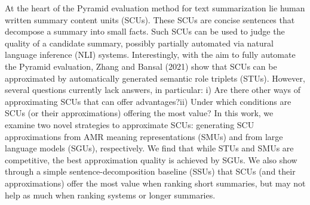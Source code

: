 At the heart of the Pyramid evaluation method for text summarization lie human written summary content units (SCUs). These SCUs are concise sentences that decompose a summary into small facts. Such SCUs can be used to judge the quality of a candidate summary, possibly partially automated via natural language inference (NLI) systems. Interestingly, with the aim to fully automate the Pyramid evaluation, Zhang and Bansal (2021) show that SCUs can be approximated by automatically generated semantic role triplets (STUs). However, several questions currently lack answers, in particular: i) Are there other ways of approximating SCUs that can offer advantages?ii) Under which conditions are SCUs (or their approximations) offering the most value? In this work, we examine two novel strategies to approximate SCUs: generating SCU approximations from AMR meaning representations (SMUs) and from large language models (SGUs), respectively. We find that while STUs and SMUs are competitive, the best approximation quality is achieved by SGUs. We also show through a simple sentence-decomposition baseline (SSUs) that SCUs (and their approximations) offer the most value when ranking short summaries, but may not help as much when ranking systems or longer summaries.